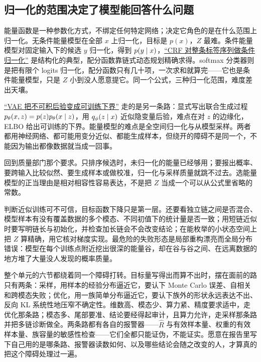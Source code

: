 \subsection{归一化的范围决定了模型能回答什么问题}

能量函数是一种参数化方式，不绑定任何特定网络；决定它角色的是在什么范围上归一化。无条件能量模型在全部 \(x\) 上归一化，目标是 \(p(x)\)，\(Z\) 最难。条件能量模型对固定输入下的候选 \(y\) 归一化，得到 \(p(y\mid x)\)，\hyperref[sec:13-Machine-Learning/07-Graphical-and-Sequential-Models/04]{``CRF 对整条标签序列做条件归一化''} 是结构化的典型，配分函数靠链式动态规划精确求得。softmax 分类器则是把有限个 logits 归一化，配分函数只有几十项，一次求和就算完——它也是条件能量模型，只是 \(Z\) 小到没人愿意提它。同一个公式，三种归一化范围，难度差出天壤。

\hyperref[sec:14-Deep-Learning/06-Variational-Autoencoders/01]{``VAE 把不可积后验变成可训练下界''} 走的是另一条路：显式写出联合生成过程 \(p_\theta(x,z)=p(z)p_\theta(x\mid z)\)，用 \(q_\phi(z\mid x)\) 近似隐变量后验，难点在对 \(z\) 的边缘化，ELBO 给出可训练的下界。能量模型的难点是全空间归一化与从模型采样。两者都用神经网络、都可能用变分近似、都能生成样本，但绕开的障碍不是同一个，不能因为输出都像数据就当成一回事。

回到质量部门那个要求。只排序候选时，未归一化的能量已经够用；要报出概率、要跨输入比较似然、要生成样本或做校准，归一化与采样质量就跳不过去。选能量模型的正当理由是相对相容性容易表达，不是把 \(Z\) 当成一个可以从公式里省略的常数。

判断近似训练可不可信，目标函数下降只是第一层。还要看独立链之间是否混合、模型样本有没有覆盖数据的多个模态、不同初值下的统计量是否一致；用短链近似时要写明链长与初始化，并检查加长链会不会改变结论；在能枚举的小状态空间上把 \(Z\) 算精确，用它核对梯度实现。最危险的失败形态是局部重构漂亮而全局分布错误：模型在每个训练点附近挖出很深的能量谷，却在谷与谷之间、在远离数据的地方堆了大量没人发现的概率质量。

整个单元的六节都绕着同一个障碍打转。目标量写得出而算不出时，摆在面前的路只有两条：采样，用样本的经验分布逼近它，要认下 Monte Carlo 误差、自相关和跨模态失败；优化，用一族简单分布逼近它，要认下族外的形状永远表达不出、反向 KL 系统性地压窄不确定性。维数高、模态少、算力紧、精度要求适中，走优化那条路；模态多、尾部要准、结论要经得起审计，且算力允许，走采样那条路并把多链诊断做全。两条路都有各自的报警器——\(\widehat R\) 与有效样本量、权重的有效样本量、族容量的敏感性检查——它们全都只能证伪，不能证实。愿意在报告里写下自己用的是哪条路、报警器读数如何、以及哪些结论会随之改变的人，才算真的把这个障碍处理过一遍。
